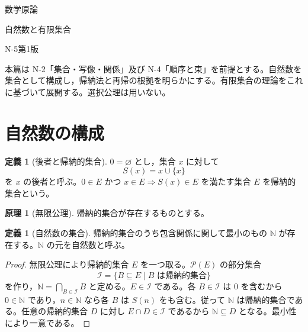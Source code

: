 \documentclass[a5paper,10pt,dvipdfmx]{jsarticle}
\theoremstyle{definition}
\newtheorem{principle}[ruledef]{原理}
\newtheorem{defn}[ruledef]{定義}
\theoremstyle{plain}
\newcommand{\impc}{\Longrightarrow}
\newcommand{\Pow}{\mathcal{P}}
\begin{document}
\begin{center}
{\small 数学原論}\par\vspace{4mm}
{\LARGE 自然数と有限集合}\par\vspace{2mm}
{\small N-5\quad 第1版}
\end{center}
本篇は N-2「集合・写像・関係」及び N-4「順序と束」を前提とする。自然数を集合として構成し，帰納法と再帰の根拠を明らかにする。有限集合の理論をこれに基づいて展開する。選択公理は用いない。
\section{自然数の構成}
\begin{defn}[後者と帰納的集合]\label{k97}
$0=\varnothing$ とし，集合 $x$ に対して
\[ S(x)=x\cup\{x\} \]
を $x$ の後者と呼ぶ。$0\in E$ かつ $x\in E\impc S(x)\in E$ を満たす集合 $E$ を帰納的集合という。
\end{defn}
\begin{principle}[無限公理]\label{k98}
帰納的集合が存在するものとする。
\end{principle}
\begin{defn}[自然数の集合]\label{k99}
帰納的集合のうち包含関係に関して最小のもの $\mathbb N$ が存在する。$\mathbb N$ の元を自然数と呼ぶ。
\end{defn}
\begin{proof}
無限公理により帰納的集合 $E$ を一つ取る。$\Pow(E)$ の部分集合
\[ \mathcal I=\{B\subseteq E\mid B\text{ は帰納的集合}\} \]
を作り，$\mathbb N=\bigcap_{B\in\mathcal I}B$ と定める。$E\in\mathcal I$ である。各 $B\in\mathcal I$ は $0$ を含むから $0\in\mathbb N$ であり，$n\in\mathbb N$ なら各 $B$ は $S(n)$ をも含む。従って $\mathbb N$ は帰納的集合である。任意の帰納的集合 $D$ に対し $E\cap D\in\mathcal I$ であるから $\mathbb N\subseteq D$ となる。最小性により一意である。
\end{proof}
\end{document}
